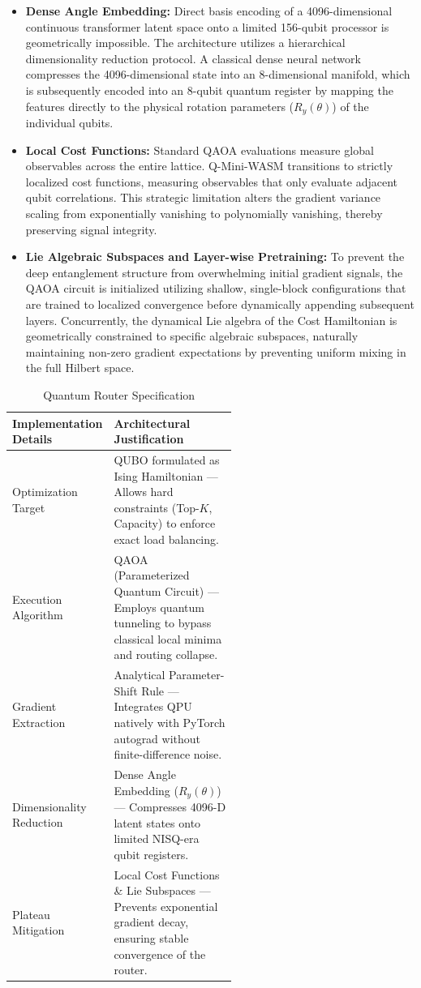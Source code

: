 \documentclass[11pt,a4paper]{article}
\begin{document}
\begin{itemize}
    \item \textbf{Dense Angle Embedding:} Direct basis encoding of a 4096-dimensional continuous transformer latent space onto a limited 156-qubit processor is geometrically impossible. The architecture utilizes a hierarchical dimensionality reduction protocol. A classical dense neural network compresses the 4096-dimensional state into an 8-dimensional manifold, which is subsequently encoded into an 8-qubit quantum register by mapping the features directly to the physical rotation parameters ($R_y(\theta)$) of the individual qubits.
    \item \textbf{Local Cost Functions:} Standard QAOA evaluations measure global observables across the entire lattice. Q-Mini-WASM transitions to strictly localized cost functions, measuring observables that only evaluate adjacent qubit correlations. This strategic limitation alters the gradient variance scaling from exponentially vanishing to polynomially vanishing, thereby preserving signal integrity.
    \item \textbf{Lie Algebraic Subspaces and Layer-wise Pretraining:} To prevent the deep entanglement structure from overwhelming initial gradient signals, the QAOA circuit is initialized utilizing shallow, single-block configurations that are trained to localized convergence before dynamically appending subsequent layers. Concurrently, the dynamical Lie algebra of the Cost Hamiltonian is geometrically constrained to specific algebraic subspaces, naturally maintaining non-zero gradient expectations by preventing uniform mixing in the full Hilbert space.
\end{itemize}

\begin{table}[htbp]
\centering
\caption{Quantum Router Specification}
\begin{tabular}{lp{0.55\linewidth}}
\toprule
\textbf{Implementation Details} & \textbf{Architectural Justification} \\
\midrule
Optimization Target & QUBO formulated as Ising Hamiltonian --- Allows hard constraints (Top-$K$, Capacity) to enforce exact load balancing. \\
Execution Algorithm & QAOA (Parameterized Quantum Circuit) --- Employs quantum tunneling to bypass classical local minima and routing collapse. \\
Gradient Extraction & Analytical Parameter-Shift Rule --- Integrates QPU natively with PyTorch autograd without finite-difference noise. \\
Dimensionality Reduction & Dense Angle Embedding ($R_y(\theta)$) --- Compresses 4096-D latent states onto limited NISQ-era qubit registers. \\
Plateau Mitigation & Local Cost Functions \& Lie Subspaces --- Prevents exponential gradient decay, ensuring stable convergence of the router. \\
\bottomrule
\end{tabular}
\end{table}
\end{document}
